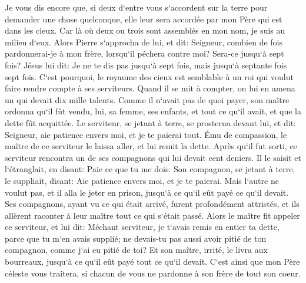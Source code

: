 \verse Je vous dis encore que, si deux d`entre vous s`accordent sur la terre pour demander une chose quelconque, elle leur sera accordée par mon Père qui est dans les cieux. 
\verse Car là où deux ou trois sont assemblés en mon nom, je suis au milieu d`eux. 
\verse Alors Pierre s`approcha de lui, et dit: Seigneur, combien de fois pardonnerai-je à mon frère, lorsqu`il péchera contre moi? Sera-ce jusqu`à sept fois? 
\verse Jésus lui dit: Je ne te dis pas jusqu`à sept fois, mais jusqu`à septante fois sept fois. 
\verse C`est pourquoi, le royaume des cieux est semblable à un roi qui voulut faire rendre compte à ses serviteurs. 
\verse Quand il se mit à compter, on lui en amena un qui devait dix mille talents. 
\verse Comme il n`avait pas de quoi payer, son maître ordonna qu`il fût vendu, lui, sa femme, ses enfants, et tout ce qu`il avait, et que la dette fût acquittée. 
\verse Le serviteur, se jetant à terre, se prosterna devant lui, et dit: Seigneur, aie patience envers moi, et je te paierai tout. 
\verse Ému de compassion, le maître de ce serviteur le laissa aller, et lui remit la dette. 
\verse Après qu`il fut sorti, ce serviteur rencontra un de ses compagnons qui lui devait cent deniers. Il le saisit et l`étranglait, en disant: Paie ce que tu me dois. 
\verse Son compagnon, se jetant à terre, le suppliait, disant: Aie patience envers moi, et je te paierai. 
\verse Mais l`autre ne voulut pas, et il alla le jeter en prison, jusqu`à ce qu`il eût payé ce qu`il devait. 
\verse Ses compagnons, ayant vu ce qui était arrivé, furent profondément attristés, et ils allèrent raconter à leur maître tout ce qui s`était passé. 
\verse Alors le maître fit appeler ce serviteur, et lui dit: Méchant serviteur, je t`avais remis en entier ta dette, parce que tu m`en avais supplié; 
\verse ne devais-tu pas aussi avoir pitié de ton compagnon, comme j`ai eu pitié de toi? 
\verse Et son maître, irrité, le livra aux bourreaux, jusqu`à ce qu`il eût payé tout ce qu`il devait. 
\verse C`est ainsi que mon Père céleste vous traitera, si chacun de vous ne pardonne à son frère de tout son coeur. 

\chapter{}

